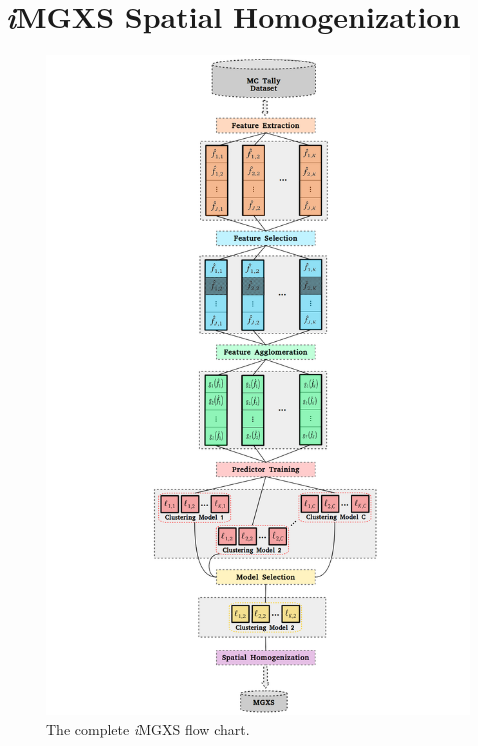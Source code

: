 \section{\textit{i}\ac{MGXS} Spatial Homogenization}
\label{sec:chap10-imgxs-pipeline}

\begin{figure}[h!]
\centering
\includegraphics[width=0.95\linewidth]{figures/unsupervised/features/engineering/flow-chart}
\vspace{2mm}
\caption[\textit{i}MGXS flow chart]{The complete \textit{i}\ac{MGXS} flow chart.}
\label{fig:chap10-flow-chart}
\end{figure}


